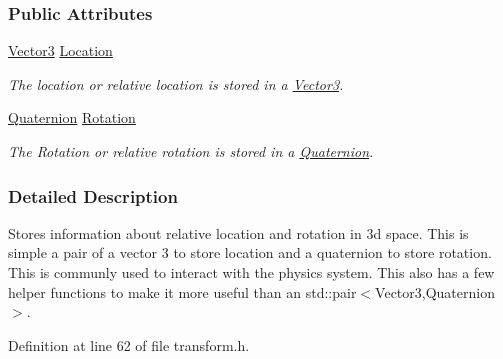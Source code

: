 \subsubsection*{Public Attributes}
\begin{DoxyCompactItemize}
\item 
\hypertarget{classphys_1_1Transform_a2d3cb85313d0aaa3f243cfa07ae4d90c}{
\hyperlink{classphys_1_1Vector3}{Vector3} \hyperlink{classphys_1_1Transform_a2d3cb85313d0aaa3f243cfa07ae4d90c}{Location}}
\label{classphys_1_1Transform_a2d3cb85313d0aaa3f243cfa07ae4d90c}

\begin{DoxyCompactList}\small\item\em The location or relative location is stored in a \hyperlink{classphys_1_1Vector3}{Vector3}. \item\end{DoxyCompactList}\item 
\hypertarget{classphys_1_1Transform_a5e6cef1f7e16d937911f95e4b86ecddd}{
\hyperlink{classphys_1_1Quaternion}{Quaternion} \hyperlink{classphys_1_1Transform_a5e6cef1f7e16d937911f95e4b86ecddd}{Rotation}}
\label{classphys_1_1Transform_a5e6cef1f7e16d937911f95e4b86ecddd}

\begin{DoxyCompactList}\small\item\em The Rotation or relative rotation is stored in a \hyperlink{classphys_1_1Quaternion}{Quaternion}. \item\end{DoxyCompactList}\end{DoxyCompactItemize}


\subsubsection{Detailed Description}
Stores information about relative location and rotation in 3d space. This is simple a pair of a vector 3 to store location and a quaternion to store rotation. This is communly used to interact with the physics system. This also has a few helper functions to make it more useful than an std::pair$<$Vector3,Quaternion$>$. 

Definition at line 62 of file transform.h.



